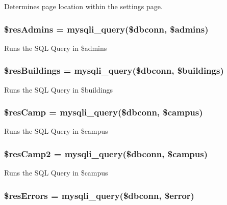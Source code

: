 \-Determines page location within the settings page. \hypertarget{settings_8php_a01f28ab79ba230a18421177d38277f7c}{
\subsubsection[{\$res\-Admins}]{\setlength{\rightskip}{0pt plus 5cm}\$res\-Admins = mysqli\-\_\-query(\$dbconn, \$admins)}}\label{settings_8php_a01f28ab79ba230a18421177d38277f7c}
\-Runs the \-S\-Q\-L \-Query in \$admins \hypertarget{settings_8php_ad13e1ac4736397ee0c0755924e4a2167}{
\subsubsection[{\$res\-Buildings}]{\setlength{\rightskip}{0pt plus 5cm}\$res\-Buildings = mysqli\-\_\-query(\$dbconn, \$buildings)}}\label{settings_8php_ad13e1ac4736397ee0c0755924e4a2167}
\-Runs the \-S\-Q\-L \-Query in \$buildings \hypertarget{settings_8php_a926be07138c512547f16ff9996acaf0b}{
\subsubsection[{\$res\-Camp}]{\setlength{\rightskip}{0pt plus 5cm}\$res\-Camp = mysqli\-\_\-query(\$dbconn, \$campus)}}\label{settings_8php_a926be07138c512547f16ff9996acaf0b}
\-Runs the \-S\-Q\-L \-Query in \$campus \hypertarget{settings_8php_aeef360c79af90d6206e9afd0c3fb2f47}{
\subsubsection[{\$res\-Camp2}]{\setlength{\rightskip}{0pt plus 5cm}\$res\-Camp2 = mysqli\-\_\-query(\$dbconn, \$campus)}}\label{settings_8php_aeef360c79af90d6206e9afd0c3fb2f47}
\-Runs the \-S\-Q\-L \-Query in \$campus \hypertarget{settings_8php_a1e38f7424dfc03f443c41bf83e9e90bd}{
\subsubsection[{\$res\-Errors}]{\setlength{\rightskip}{0pt plus 5cm}\$res\-Errors = mysqli\-\_\-query(\$dbconn, \$error)}}\label{settings_8php_a1e38f7424dfc03f443c41bf83e9e90bd}

